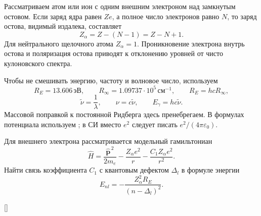 \documentclass[../final.tex]{subfiles}
\begin{document}

\begingroup
\renewcommand{\thesection}{2.\arabic{section}}


Рассматриваем атом или ион с одним внешним электроном над замкнутым
остовом. Если заряд ядра равен $Ze$, а полное число электронов равно $N$,
то заряд остова, видимый издалека, составляет
\[
    Z_{\alpha}=Z-(N-1)=Z-N+1.
\]
Для нейтрального щелочного атома $Z_{\alpha}=1$.
Проникновение электрона внутрь остова и поляризация остова приводят
к отклонению уровней от чисто кулоновского спектра.

Чтобы не смешивать энергию, частоту и волновое число, используем
\[
    R_E=13.606\,\text{эВ},\qquad
    R_\infty=1.09737\cdot10^5\,\text{см}^{-1},\qquad
    R_E=hcR_\infty,
\]
\[
    \widetilde\nu=\frac1\lambda,\qquad
    \nu=c\widetilde\nu,\qquad E_\gamma=hc\widetilde\nu.
\]
Массовой поправкой к постоянной Ридберга здесь пренебрегаем.
В формулах потенциала используем ; в СИ вместо $e^2$
следует писать $e^2/(4\pi\varepsilon_0)$.


\condition
Для внешнего электрона рассматривается модельный гамильтониан
\[
    \hat H=\frac{\hat{\mathbf p}^{\,2}}{2m_e}
       -\frac{Z_{\alpha}e^2}{r}
       -\frac{C_1Z_{\alpha}e^2}{r^2}.
\]
Найти связь коэффициента $C_1$ с квантовым дефектом $\Delta_l$
в формуле энергии
\[
    E_{nl}=-\frac{Z_{\alpha}^2R_E}{(n-\Delta_l)^2}.
\]

\begin{rbox}[unbreakable,left=12pt,right=12pt,top=12pt,bottom=10pt]{[]}
\centering
{}
\end{rbox}
\end{document}
